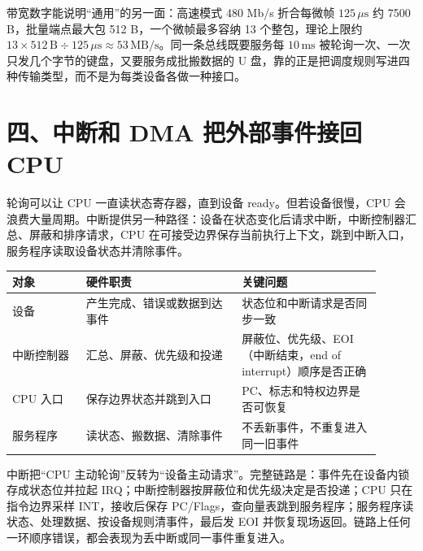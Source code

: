 带宽数字能说明“通用”的另一面：高速模式 480 Mb/s 折合每微帧 $125\,\mu\text{s}$ 约 7500 B，批量端点最大包 512 B，一个微帧最多容纳 13 个整包，理论上限约 $13\times512\,\text{B}\div125\,\mu\text{s}\approx53\,\text{MB/s}$。同一条总线既要服务每 $10\,\text{ms}$ 被轮询一次、一次只发几个字节的键盘，又要服务成批搬数据的 U 盘，靠的正是把调度规则写进四种传输类型，而不是为每类设备各做一种接口。

\section{四、中断和 DMA 把外部事件接回 CPU}

轮询可以让 CPU 一直读状态寄存器，直到设备 ready。但若设备很慢，CPU 会浪费大量周期。中断提供另一种路径：设备在状态变化后请求中断，中断控制器汇总、屏蔽和排序请求，CPU 在可接受边界保存当前执行上下文，跳到中断入口，服务程序读取设备状态并清除事件。

\begin{longtable}{L{0.18\linewidth}L{0.38\linewidth}L{0.34\linewidth}}
\toprule
对象 & 硬件职责 & 关键问题 \\
\midrule
设备 & 产生完成、错误或数据到达事件 & 状态位和中断请求是否同步一致 \\
中断控制器 & 汇总、屏蔽、优先级和投递 & 屏蔽位、优先级、EOI（中断结束，end of interrupt）顺序是否正确 \\
CPU 入口 & 保存边界状态并跳到入口 & PC、标志和特权边界是否可恢复 \\
服务程序 & 读状态、搬数据、清除事件 & 不丢新事件，不重复进入同一旧事件 \\
\bottomrule
\end{longtable}

中断把“CPU 主动轮询”反转为“设备主动请求”。完整链路是：事件先在设备内锁存成状态位并拉起 IRQ；中断控制器按屏蔽位和优先级决定是否投递；CPU 只在指令边界采样 INT，接收后保存 PC/Flags，查向量表跳到服务程序；服务程序读状态、处理数据、按设备规则清事件，最后发 EOI 并恢复现场返回。链路上任何一环顺序错误，都会表现为丢中断或同一事件重复进入。

